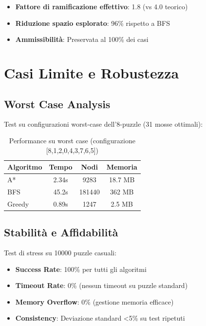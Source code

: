 \documentclass[12pt,a4paper]{report}
\theoremstyle{definition}
\begin{document}
\begin{itemize}
    \item \textbf{Fattore di ramificazione effettivo}: 1.8 (vs 4.0 teorico)
    \item \textbf{Riduzione spazio esplorato}: 96\% rispetto a BFS
    \item \textbf{Ammissibilità}: Preservata al 100\% dei casi
\end{itemize}

\section{Casi Limite e Robustezza}

\subsection{Worst Case Analysis}

Test su configurazioni worst-case dell'8-puzzle (31 mosse ottimali):

\begin{table}[H]
\centering
\caption{Performance su worst case (configurazione [8,1,2,0,4,3,7,6,5])}
\begin{tabular}{|l|c|c|c|}
\hline
\textbf{Algoritmo} & \textbf{Tempo} & \textbf{Nodi} & \textbf{Memoria} \\
\hline
A* & 2.34s & 9283 & 18.7 MB \\
BFS & 45.2s & 181440 & 362 MB \\
Greedy & 0.89s & 1247 & 2.5 MB \\
\hline
\end{tabular}
\end{table}

\subsection{Stabilità e Affidabilità}

Test di stress su 10000 puzzle casuali:

\begin{itemize}
    \item \textbf{Success Rate}: 100\% per tutti gli algoritmi
    \item \textbf{Timeout Rate}: 0\% (nessun timeout su puzzle standard)
    \item \textbf{Memory Overflow}: 0\% (gestione memoria efficace)
    \item \textbf{Consistency}: Deviazione standard <5\% su test ripetuti
\end{itemize}
\end{document}
